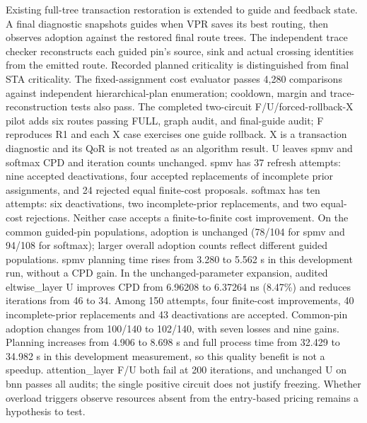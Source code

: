 \documentclass[conference,10pt]{IEEEtran}
\begin{document}
Existing full-tree transaction restoration is extended to guide and feedback state. A final diagnostic snapshots guides when VPR saves its best routing, then observes adoption against the restored final route trees. The independent trace checker reconstructs each guided pin's source, sink and actual crossing identities from the emitted route. Recorded planned criticality is distinguished from final STA criticality. The fixed-assignment cost evaluator passes 4,280 comparisons against independent hierarchical-plan enumeration; cooldown, margin and trace-reconstruction tests also pass. The completed two-circuit F/U/forced-rollback-X pilot adds six routes passing FULL, graph audit, and final-guide audit; F reproduces R1 and each X case exercises one guide rollback. X is a transaction diagnostic and its QoR is not treated as an algorithm result. U leaves spmv and softmax CPD and iteration counts unchanged. spmv has 37 refresh attempts: nine accepted deactivations, four accepted replacements of incomplete prior assignments, and 24 rejected equal finite-cost proposals. softmax has ten attempts: six deactivations, two incomplete-prior replacements, and two equal-cost rejections. Neither case accepts a finite-to-finite cost improvement. On the common guided-pin populations, adoption is unchanged (78/104 for spmv and 94/108 for softmax); larger overall adoption counts reflect different guided populations. spmv planning time rises from 3.280 to 5.562 s in this development run, without a CPD gain. In the unchanged-parameter expansion, audited eltwise\_layer U improves CPD from 6.96208 to 6.37264 ns (8.47\%) and reduces iterations from 46 to 34. Among 150 attempts, four finite-cost improvements, 40 incomplete-prior replacements and 43 deactivations are accepted. Common-pin adoption changes from 100/140 to 102/140, with seven losses and nine gains. Planning increases from 4.906 to 8.698 s and full process time from 32.429 to 34.982 s in this development measurement, so this quality benefit is not a speedup. attention\_layer F/U both fail at 200 iterations, and unchanged U on bnn passes all audits; the single positive circuit does not justify freezing. Whether overload triggers observe resources absent from the entry-based pricing remains a hypothesis to test.
\end{document}
